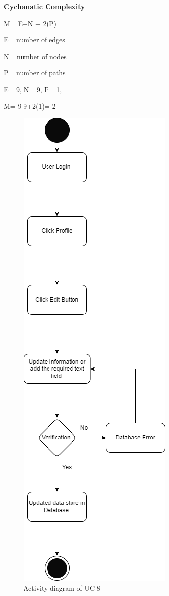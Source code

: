\textbf{Cyclomatic Complexity}

M= E+N + 2(P)

E= number of edges

N= number of nodes

P= number of paths

E= 9,
N= 9,
P= 1,

M= 9-9+2(1)= 2

\begin{figure}[H]
    \centering
    \includegraphics[scale=0.6]{./diagrams/Activity Diagram/ad-08.png}
    \caption{Activity diagram of UC-8}
    \label{fig:act-08}

\end{figure}


